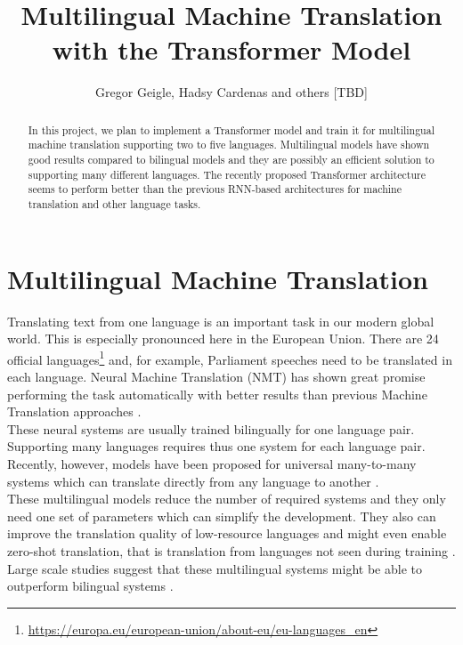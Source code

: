 \documentclass[article,accentcolor=tud8d,bibliography=totoc]{tudreport}
\title{Multilingual Machine Translation with the Transformer Model}
\subtitle{Gregor Geigle, Hadsy Cardenas and others [TBD]}
\begin{document}
\maketitle
\begin{abstract}
In this project, we plan to implement a Transformer model and train it for multilingual machine translation supporting two to five languages.
Multilingual models have shown good results compared to bilingual models and they are possibly an efficient solution to supporting many different languages. 
The recently proposed Transformer architecture seems to perform better than the previous RNN-based architectures for machine translation and other language tasks.
\end{abstract}  

\tableofcontents

\section{Multilingual Machine Translation}
Translating text from one language is an important task in our modern global world.
This is especially pronounced here in the European Union. 
There are 24 official languages\footnote{\url{https://europa.eu/european-union/about-eu/eu-languages_en}} and, for example, Parliament speeches need to be translated in each language.
Neural Machine Translation (NMT) has shown great promise performing the task automatically with better results than previous Machine Translation approaches \autocite{DBLP:journals/corr/WuSCLNMKCGMKSJL16}.\\
These neural systems are usually trained bilingually for one language pair.
Supporting many languages requires thus one system for each language pair.
Recently, however, models have been proposed for universal many-to-many systems which can translate directly from any language to another \autocite{DBLP:journals/corr/HaNW16,johnson2017google}.\\
These multilingual models reduce the number of required systems and they only need one set of parameters which can simplify the development. 
They also can improve the translation quality of low-resource languages and might even enable zero-shot translation, that is translation from languages not seen during training \autocite{DBLP:journals/corr/abs-1903-00089}.\\
Large scale studies suggest that these multilingual systems might be able to outperform bilingual systems \autocite{DBLP:journals/corr/abs-1806-06957,DBLP:journals/corr/abs-1903-00089}.
\end{document}
